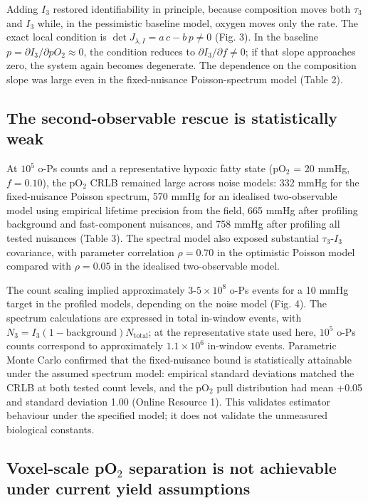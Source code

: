 \documentclass[pdflatex,sn-mathphys-num]{sn-jnl}
\begin{document}
Adding \(I_3\) restored identifiability in principle, because composition moves both \(\tau_3\) and \(I_3\) while, in the pessimistic baseline model, oxygen moves only the rate. The exact local condition is \(\det J_{\lambda,I}=a\,c-b\,p\neq0\) (Fig. 3). In the baseline \(p=\partial I_3/\partial pO_2\approx0\), the condition reduces to \(\partial I_3/\partial f\neq0\); if that slope approaches zero, the system again becomes degenerate. The dependence on the composition slope was large even in the fixed-nuisance Poisson-spectrum model (Table 2).

\subsection{The second-observable rescue is statistically weak}\label{the-second-observable-rescue-is-statistically-weak}

At \(10^5\) o-Ps counts and a representative hypoxic fatty state (pO\(_2\) = 20 mmHg, \(f=0.10\)), the pO\(_2\) CRLB remained large across noise models: 332 mmHg for the fixed-nuisance Poisson spectrum, 570 mmHg for an idealised two-observable model using empirical lifetime precision from the field, 665 mmHg after profiling background and fast-component nuisances, and 758 mmHg after profiling all tested nuisances (Table 3). The spectral model also exposed substantial \(\tau_3\)-\(I_3\) covariance, with parameter correlation \(\rho=0.70\) in the optimistic Poisson model compared with \(\rho=0.05\) in the idealised two-observable model.

The count scaling implied approximately \(3\)-\(5\times10^8\) o-Ps events for a 10 mmHg target in the profiled models, depending on the noise model (Fig. 4). The spectrum calculations are expressed in total in-window events, with \(N_3=I_3(1-\mathrm{background})N_{\mathrm{total}}\); at the representative state used here, \(10^5\) o-Ps counts correspond to approximately \(1.1\times10^6\) in-window events. Parametric Monte Carlo confirmed that the fixed-nuisance bound is statistically attainable under the assumed spectrum model: empirical standard deviations matched the CRLB at both tested count levels, and the pO\(_2\) pull distribution had mean +0.05 and standard deviation 1.00 (Online Resource 1). This validates estimator behaviour under the specified model; it does not validate the unmeasured biological constants.

\subsection[Voxel-scale pO2 separation is not achievable under current yield assumptions]{\texorpdfstring{Voxel-scale pO$_2$ separation}{Voxel-scale pO2 separation} is not achievable under current yield assumptions}\label{voxel-scale-po_2-separation-is-not-achievable-under-current-yield-assumptions}
\end{document}

